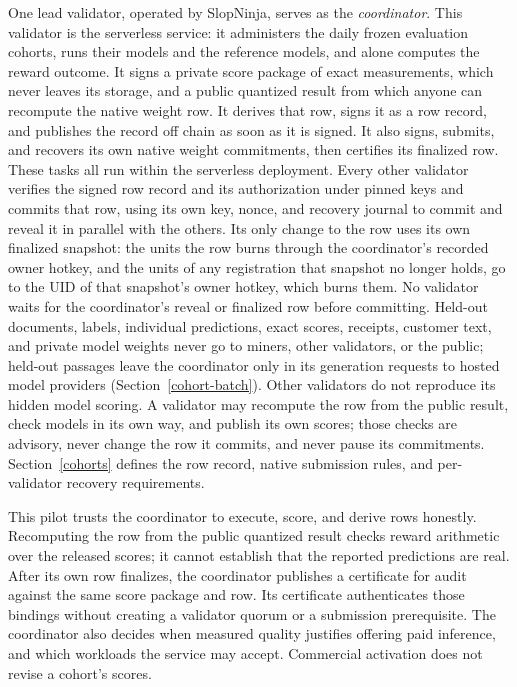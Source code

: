 One lead validator, operated by SlopNinja, serves as the \emph{coordinator}.
This validator is the serverless service: it administers the daily frozen
evaluation cohorts, runs their models and the reference models, and alone
computes the reward outcome. It signs a private score package of exact
measurements, which never leaves its storage, and a public quantized result
from which anyone can recompute the native weight row. It derives that row,
signs it as a row record, and publishes the record off chain as soon as it is
signed. It also signs, submits, and recovers its own native weight
commitments, then certifies its finalized row. These tasks all
run within the serverless deployment.
Every other validator verifies the signed row record and its authorization
under pinned keys and commits that row, using its own key, nonce, and recovery
journal to commit and reveal it in parallel with the others. Its only
change to the row uses its own finalized snapshot: the units the row burns
through the coordinator's recorded owner hotkey, and the units of any
registration that snapshot no longer holds, go to the UID of that snapshot's
owner hotkey, which burns them. No validator waits for the coordinator's reveal or finalized
row before committing. Held-out documents, labels, individual predictions,
exact scores, receipts, customer text, and private model weights never go to
miners, other validators, or the public; held-out passages leave the
coordinator only in its generation requests to hosted model providers
(Section~\ref{cohort-batch}). Other validators do not reproduce its hidden
model scoring. A validator may recompute the row from the public result, check models
in its own way, and publish its own scores; those checks are advisory, never
change the row it commits, and never pause its commitments.
Section~\ref{cohorts} defines the row record, native submission rules,
and per-validator recovery requirements.

This pilot trusts the coordinator to execute, score, and derive rows honestly.
Recomputing the row from the public quantized result checks reward arithmetic
over the released scores; it cannot establish that the reported predictions are
real. After its own row finalizes,
the coordinator publishes a certificate for audit against the same
score package and row. Its certificate authenticates those bindings
without creating a validator quorum or a submission prerequisite.
The coordinator also decides when measured quality justifies offering paid
inference, and which workloads the service may accept. Commercial activation
does not revise a cohort's scores.

